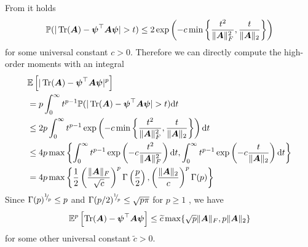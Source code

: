 From \cite[Theorem 1.1]{rudelson-2013-hansonwright-inequality} it holds
\begin{equation}
    \mathbb{P}(|\operatorname{Tr}(\boldsymbol{A}) - \boldsymbol{\psi}^{\top} \boldsymbol{A} \boldsymbol{\psi}| > t) \leq 2 \exp \left( - c \min \left\{ \frac{t^2}{\lVert \boldsymbol{A} \rVert _F^2},  \frac{t}{\lVert \boldsymbol{A} \rVert _2} \right\} \right)
\end{equation}
for some universal constant $c > 0$. Therefore we can directly compute the high-order moments with an integral
\begin{align}
    &\mathbb{E}\left[ |\operatorname{Tr}(\boldsymbol{A}) - \boldsymbol{\psi}^{\top} \boldsymbol{A} \boldsymbol{\psi}|^p \right] \notag \\
    &= p \int_{0}^{\infty} t^{p-1} \mathbb{P}(|\operatorname{Tr}(\boldsymbol{A}) - \boldsymbol{\psi}^{\top} \boldsymbol{A} \boldsymbol{\psi}| > t) \mathrm{d}t \notag \\
    &\leq 2 p \int_{0}^{\infty} t^{p-1} \exp \left( - c \min \left\{ \frac{t^2}{\lVert \boldsymbol{A} \rVert _F^2},  \frac{t}{\lVert \boldsymbol{A} \rVert _2} \right\} \right) \mathrm{d}t \notag \\
    &\leq 4 p \max\left\{ \int_{0}^{\infty} t^{p-1} \exp \left( - c \frac{t^2}{\lVert \boldsymbol{A} \rVert _F^2} \right) \mathrm{d}t, \int_{0}^{\infty} t^{p-1} \exp \left( - c \frac{t}{\lVert \boldsymbol{A} \rVert _2} \right) \mathrm{d}t \right\} \notag \\
    &=  4 p \max\left\{ \frac{1}{2} \left( \frac{\lVert \boldsymbol{A} \rVert _F}{\sqrt{c}} \right)^p \Gamma\left(\frac{p}{2}\right), \left(\frac{\lVert \boldsymbol{A} \rVert _2}{c} \right)^p \Gamma(p) \right\}
\end{align}
Since $\Gamma(p)^{{}^{1}{\mskip -5mu/\mskip -3mu}_{p}} \leq p$ and $\Gamma(p/2)^{{}^{1}{\mskip -5mu/\mskip -3mu}_{p}} \leq \sqrt{p \pi}$ for $p \geq 1$ , we have 
\begin{equation}
    \mathbb{E}^p\left[ \operatorname{Tr}(\boldsymbol{A}) - \boldsymbol{\psi}^{\top} \boldsymbol{A} \boldsymbol{\psi} \right]
    \leq \widetilde{c} \max\{ \sqrt{p} \lVert \boldsymbol{A} \rVert _F, p \lVert \boldsymbol{A} \rVert _2 \}
\end{equation}
for some other universal constant $\widetilde{c} > 0$.